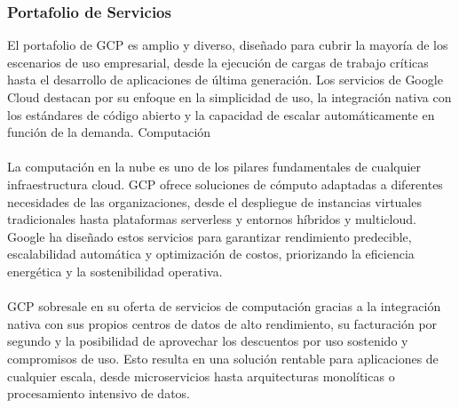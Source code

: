 {            \subsubsection{Portafolio de Servicios}
                El portafolio de GCP es amplio y diverso, diseñado para cubrir la mayoría de los escenarios de uso empresarial, desde la ejecución de cargas de trabajo críticas hasta el desarrollo de aplicaciones de última generación. Los servicios de Google Cloud destacan por su enfoque en la simplicidad de uso, la integración nativa con los estándares de código abierto y la capacidad de escalar automáticamente en función de la demanda.
                Computación
                
               \paragraph{} La computación en la nube es uno de los pilares fundamentales de cualquier infraestructura cloud. GCP ofrece soluciones de cómputo adaptadas a diferentes necesidades de las organizaciones, desde el despliegue de instancias virtuales tradicionales hasta plataformas serverless y entornos híbridos y multicloud. Google ha diseñado estos servicios para garantizar rendimiento predecible, escalabilidad automática y optimización de costos, priorizando la eficiencia energética y la sostenibilidad operativa.
                
                \paragraph{}GCP sobresale en su oferta de servicios de computación gracias a la integración nativa con sus propios centros de datos de alto rendimiento, su facturación por segundo y la posibilidad de aprovechar los descuentos por uso sostenido y compromisos de uso. Esto resulta en una solución rentable para aplicaciones de cualquier escala, desde microservicios hasta arquitecturas monolíticas o procesamiento intensivo de datos.
                
}
